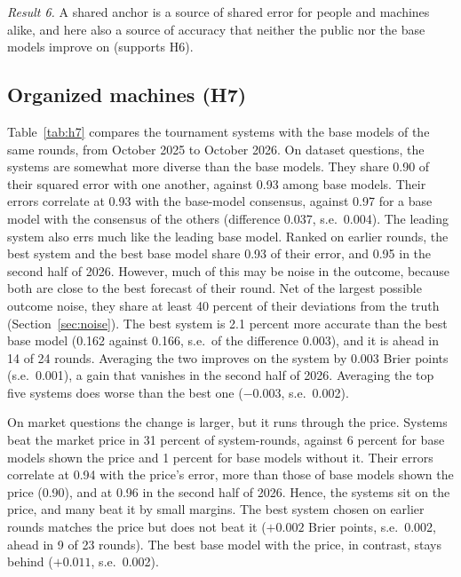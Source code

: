 \documentclass[11pt,a4paper]{article}
\theoremstyle{definition}
\begin{document}
\emph{Result 6.} A shared anchor is a source of shared error for people and machines alike, and here also a source of accuracy that neither the public nor the base models improve on (supports H6).

\subsection{Organized machines (H7)}\label{sec:h7}

Table~\ref{tab:h7} compares the tournament systems with the base models of the same rounds, from October 2025 to October 2026. On dataset questions, the systems are somewhat more diverse than the base models. They share 0.90 of their squared error with one another, against 0.93 among base models. Their errors correlate at 0.93 with the base-model consensus, against 0.97 for a base model with the consensus of the others (difference 0.037, s.e.\ 0.004). The leading system also errs much like the leading base model. Ranked on earlier rounds, the best system and the best base model share 0.93 of their error, and 0.95 in the second half of 2026. However, much of this may be noise in the outcome, because both are close to the best forecast of their round. Net of the largest possible outcome noise, they share at least 40 percent of their deviations from the truth (Section~\ref{sec:noise}). The best system is 2.1 percent more accurate than the best base model (0.162 against 0.166, s.e.\ of the difference 0.003), and it is ahead in 14 of 24 rounds. Averaging the two improves on the system by 0.003 Brier points (s.e.\ 0.001), a gain that vanishes in the second half of 2026. Averaging the top five systems does worse than the best one ($-0.003$, s.e.\ 0.002).

On market questions the change is larger, but it runs through the price. Systems beat the market price in 31 percent of system-rounds, against 6 percent for base models shown the price and 1 percent for base models without it. Their errors correlate at 0.94 with the price's error, more than those of base models shown the price (0.90), and at 0.96 in the second half of 2026. Hence, the systems sit on the price, and many beat it by small margins. The best system chosen on earlier rounds matches the price but does not beat it ($+0.002$ Brier points, s.e.\ 0.002, ahead in 9 of 23 rounds). The best base model with the price, in contrast, stays behind ($+0.011$, s.e.\ 0.002).
\end{document}
